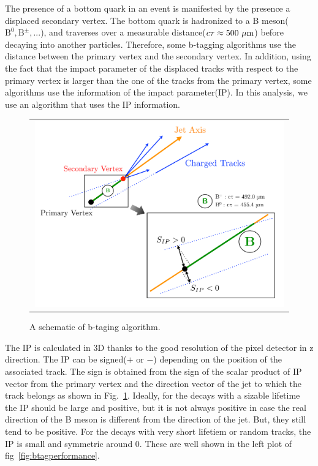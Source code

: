 The presence of a bottom quark in an event is manifested by the presence 
a displaced secondary vertex. 
The bottom quark is hadronized to a B meson($\textrm{B}^0, \textrm{B}^\pm, ...$), 
and traverses over a measurable distance($c\tau \approx 500~\mu\mathrm{m}$) before decaying into 
another particles. Therefore, some b-tagging algorithms use 
the distance between the primary vertex and the secondary vertex. 
In addition, using the fact that the impact parameter of the displaced 
tracks with respect to the primary vertex is larger than the one 
of the tracks from the primary vertex, some algorithms use the information 
of the impact parameter(IP). In this analysis, we use an algorithm that 
uses the IP information. 

\begin{figure}[htp] 
\centering 
\begin{tabular}{c} 
\includegraphics[width=0.99\textwidth]{figures/Btag.pdf} 
\end{tabular} 
\caption{A schematic of b-taging algorithm.}
\label{fig:btag} 
\end{figure} 
The IP is calculated in 3D thanks to the good resolution of the 
pixel detector in z direction. The IP can be signed($+$ or $-$) 
depending on the position of the associated track. 
The sign is obtained from the sign of the scalar product of 
IP vector from the primary vertex and the direction vector of the jet 
to which the track belongs as shown in Fig.~\ref{fig:btag}.
Ideally, for the decays with a sizable lifetime the IP should be large and positive, 
but it is not always positive in case the real direction of the B meson 
is different from the direction of the jet. But, they still tend to be positive. 
For the decays with very short lifetiem or random tracks, 
the IP is small and symmetric around 0.   
These are well shown in the left plot of fig~\ref{fig:btagperformance}.

